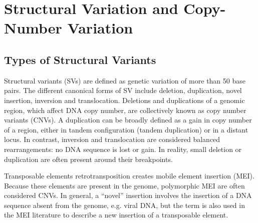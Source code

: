 \section{Structural Variation and Copy-Number Variation}

\subsection{Types of Structural Variants}
Structural variants (SVs) are defined as genetic variation of more than 50 base pairs.
The different canonical forms of SV include deletion, duplication, novel insertion, inversion and translocation\cite{Hall2012}.
Deletions and duplications of a genomic region, which affect DNA copy number, are collectively known as copy number variants (CNVs).
A duplication can be broadly defined as a gain in copy number of a region, either in tandem configuration (tandem duplication) or in a distant locus.
In contrast, inversion and translocation are considered balanced rearrangements: no DNA sequence is lost or gain.
In reality, small deletion or duplication are often present around their breakpoints\cite{Sudmant2015a,Collins2017}.
\begin{comment}
  In \citet{Sudmant2015a}, only 20\% are simple inversions; 54\% are duplicated inversion and the rest with other CNVs.
\end{comment}
Transposable elements retrotransposition creates mobile element insertion (MEI).
Because these elements are present in the genome, polymorphic MEI are often considered CNVs.
In general, a ``novel'' insertion involves the insertion of a DNA sequence absent from the genome, e.g. viral DNA, but the term is also used in the MEI literature to describe a new insertion of a transposable element.

